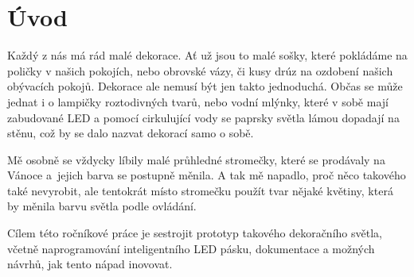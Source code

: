 \chapter*{Úvod}

Každý z nás má rád malé dekorace. Ať už jsou to malé sošky, které pokládáme na poličky v našich pokojích, nebo obrovské vázy, či kusy drúz na ozdobení našich obývacích pokojů. Dekorace ale nemusí být jen takto jednoduchá. Občas se může jednat i o lampičky roztodivných tvarů, nebo vodní mlýnky, které v sobě mají zabudované LED a pomocí cirkulující vody se paprsky světla lámou dopadají na stěnu, což by se dalo nazvat dekorací samo o sobě.

Mě osobně se vždycky líbily malé průhledné stromečky, které se prodávaly na Vánoce a~jejich barva se postupně měnila. A tak mě napadlo, proč něco takového také nevyrobit, ale tentokrát místo stromečku použít tvar nějaké květiny, která by měnila barvu světla podle ovládání. %


Cílem této ročníkové práce je sestrojit prototyp takového dekoračního světla, včetně naprogramování inteligentního LED pásku, dokumentace a možných návrhů, jak tento nápad inovovat.






